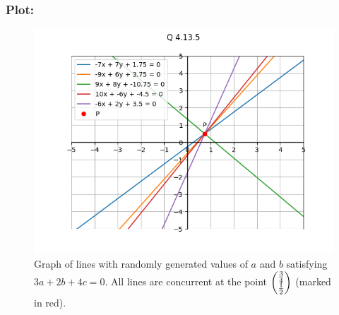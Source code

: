 \documentclass{beamer}
\begin{document}
\begin{frame}
    \frametitle{Plot: }
    \begin{figure}[h!]
        \centering
        \includegraphics[width=0.8\columnwidth]{../figs/plot.png}
        \caption{Graph of lines with randomly generated values of $a$ and $b$ satisfying $3a + 2b + 4c = 0$. All lines are concurrent at the point $\begin{pmatrix}\frac{3}{4} \\ \frac{1}{2}\end{pmatrix}$ (marked in red).}
        \label{fig:4.2.3}
    \end{figure}
\end{frame}
\end{document}
